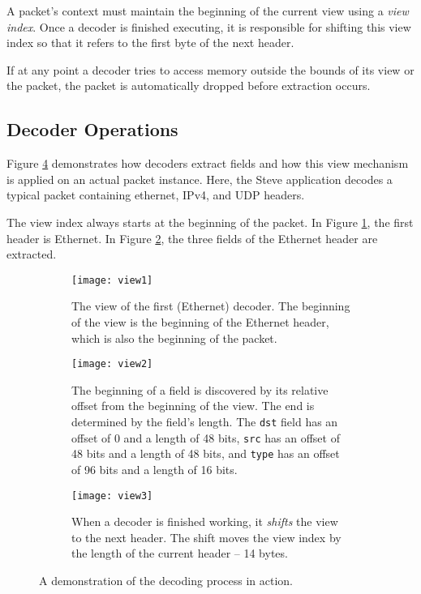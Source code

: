 A packet's context must maintain the beginning of the current view using
a \emph{view index}. Once a decoder is finished executing, it is
responsible for shifting this view index so that it refers to the
first byte of the next header.

If at any point a decoder tries to access memory outside the bounds of its
view or the packet, the packet is automatically dropped before extraction occurs.

\subsection{Decoder Operations} \label{tut:extract_how}

Figure \ref{fg:decoding} demonstrates how decoders extract fields and
how this view mechanism is applied on an actual packet instance. 
Here, the Steve application decodes a typical packet 
containing ethernet, IPv4, and UDP headers.
 
The view index always starts at the beginning of the packet.
In Figure \ref{fg:view1}, the first header is Ethernet.
In Figure \ref{fg:view2}, the three fields of the Ethernet header
are extracted.

\begin{figure}[ht]
\begin{subfigure}[t, scale=0.5]{.45\textwidth}
  \centering
  \texttt{[image: view1]}
  \caption{The view of the first (Ethernet) decoder. 
  The beginning of the view is the beginning of the Ethernet
  header, which is also the beginning of the packet.}
  \label{fg:view1}
\end{subfigure}%
\hfill
\begin{subfigure}[t, scale=0.5]{0.45\textwidth}
  \centering
  \texttt{[image: view2]}
  \caption{The beginning of a field is discovered by its relative offset from
the beginning of the view. The end is determined by the field's length. The \texttt{dst} field has an offset of 0 and a length of 48 bits, 	\texttt{src} has an offset of 48 bits and a length of 48 bits, and \texttt{type} has an offset of 96 bits and a length of 16 bits.}
  \label{fg:view2}
\end{subfigure}

\begin{subfigure}[t]{.45\textwidth}
  \centering
  \texttt{[image: view3]}
  \caption{When a decoder is finished working, it \textit{shifts} the view to
the next header. The shift moves the view index by the length of the current
header -- 14 bytes.}
  \label{fg:view3}
\end{subfigure}%
\caption{A demonstration of the decoding process in action.}
\label{fg:decoding}
\end{figure}

